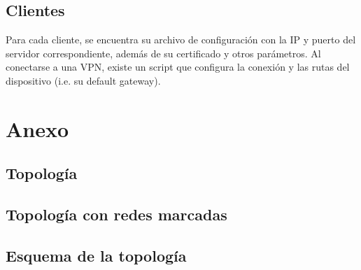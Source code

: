 \documentclass[12pt, a4paper, spanish]{article}
\begin{document}
\subsection{Clientes}
Para cada cliente, se encuentra su archivo de configuración con la IP y 
puerto del servidor correspondiente, además de su certificado y otros 
parámetros.
Al conectarse a una VPN, existe un script que configura la conexión y 
las rutas del dispositivo (i.e. su default gateway).

\newpage
\section{Anexo}
\subsection{Topología}
\subsection{Topología con redes marcadas}

\subsection{Esquema de la topología}
\end{document}
